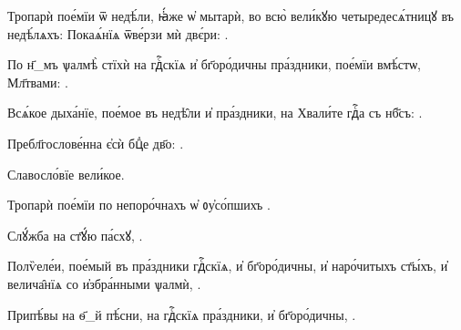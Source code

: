 Тропарѝ пое́мїи ѿ недѣ́ли, ꙗ҆́же ѡ҆ мытарѝ, во всю̀  вели́кꙋю четыредесѧ́тницꙋ въ недѣ́лѧхъ: Покаѧ́нїѧ ѿве́рзи мѝ  двє́ри: . 

По н҃_мъ ѱалмѣ̀ стїхѝ на гдⷭ҇скїѧ и҆ бг҃оро́дичны пра́здники,  пое́мїи вмѣ́стѡ, Мл҃твами: .

Всѧ́кое дыха́нїе, пое́мое въ недѣ̑ли и҆ пра́здники, на Хвали́те  гдⷭ҇а съ нб҃съ: .

Пребл҃гослове́нна є҆сѝ бцⷣе дв҃о: .

Славосло́вїе вели́кое. 

Тропарѝ пое́мїи по непоро́чнахъ ѡ҆ ᲂу҆со́пшихъ . 

Слꙋ́жба на ст҃ꙋ́ю па́схꙋ, .

Полѷеле́и, пое́мый въ пра́здники гдⷭ҇скїѧ, и҆ бг҃оро́дичны, и҆  наро́читыхъ ст҃ы́хъ, и҆ велича̑нїѧ со и҆збра́нными ѱалмѝ, . 

Припѣ́вы на ѳ҃_й пѣ́сни, на гдⷭ҇скїѧ пра́здники, и҆  бг҃оро́дичны, .



\vfil
{}
\vfil
